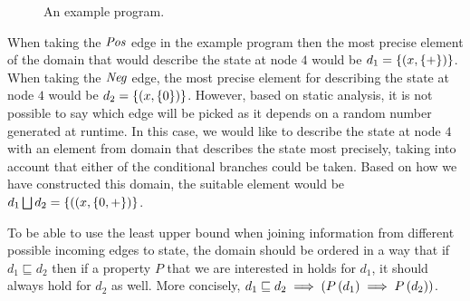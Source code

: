 \documentclass[..thesis.tex]{subfiles}
\begin{document}
\begin{figure}[H]
  \begin{center}
  \end{center}
  \caption{An example program.}
\end{figure}


When taking the $\mathit{Pos}$ edge in the example program then the most precise element of the domain that
would describe the state at node $4$ would be $d_1 = \left\lbrace \left( x, \left\lbrace + \right\rbrace \right) \right\rbrace$. When taking the $\mathit{Neg}$ edge,
the most precise element for describing the state at node $4$ would be $ d_2 = \left\lbrace \left( x, \left\lbrace 0 \right\rbrace \right) \right\rbrace$. However, based on static analysis,
it is not possible to say which edge will be picked as it depends on a random number generated at runtime.
In this case, we would like to describe the state at node $4$ with an element from domain that describes the state most precisely,
taking into account that either of the conditional branches could be taken. Based on how we have constructed this domain,
the suitable element would be $d_1 \bigsqcup d_2 = \left\lbrace \left( (x, \left\lbrace 0, + \right\rbrace \right) \right\rbrace$.

To be able to use the least upper bound when joining information from different possible incoming edges to state,
the domain should be ordered in a way that if $d_1 \sqsubseteq d_2$ then if a property $P$ that we are interested in holds for $d_1$,
it should always hold for $d_2$ as well. More concisely, $d_1 \sqsubseteq d_2 \implies\left(  P \left( d_1 \right) \implies P \left( d_2 \right) \right)$.
\end{document}
